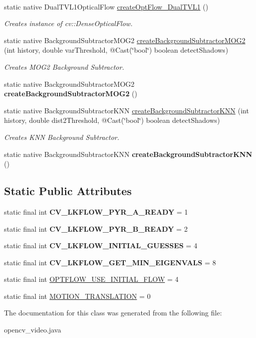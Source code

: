 \begin{DoxyCompactItemize}
$$\item 
static native Dual\+T\+V\+L1\+Optical\+Flow \hyperlink{group__video__track_ga02df311817502c4c088084195093be2e}{create\+Opt\+Flow\+\_\+\+Dual\+T\+V\+L1} ()
\begin{DoxyCompactList}\small\item\em Creates instance of cv\+::\+Dense\+Optical\+Flow. \end{DoxyCompactList}\item 
static native Background\+Subtractor\+M\+O\+G2 \hyperlink{group__video__motion_ga0820edc51bf6a34fb6ec60e0bfa47770}{create\+Background\+Subtractor\+M\+O\+G2} (int history, double var\+Threshold, @Cast(\char`\"{}bool\char`\"{}) boolean detect\+Shadows)
\begin{DoxyCompactList}\small\item\em Creates M\+O\+G2 Background Subtractor. \end{DoxyCompactList}\item 
static native Background\+Subtractor\+M\+O\+G2 {\bfseries create\+Background\+Subtractor\+M\+O\+G2} ()
\item 
static native Background\+Subtractor\+K\+NN \hyperlink{group__video__motion_ga1376788db4935dd8798d7e087e7697c9}{create\+Background\+Subtractor\+K\+NN} (int history, double dist2\+Threshold, @Cast(\char`\"{}bool\char`\"{}) boolean detect\+Shadows)
\begin{DoxyCompactList}\small\item\em Creates K\+NN Background Subtractor. \end{DoxyCompactList}\item 
static native Background\+Subtractor\+K\+NN {\bfseries create\+Background\+Subtractor\+K\+NN} ()
\end{DoxyCompactItemize}
\subsection*{Static Public Attributes}
\begin{DoxyCompactItemize}
\item 
static final int {\bfseries C\+V\+\_\+\+L\+K\+F\+L\+O\+W\+\_\+\+P\+Y\+R\+\_\+\+A\+\_\+\+R\+E\+A\+DY} = 1
\item 
static final int {\bfseries C\+V\+\_\+\+L\+K\+F\+L\+O\+W\+\_\+\+P\+Y\+R\+\_\+\+B\+\_\+\+R\+E\+A\+DY} = 2
\item 
static final int {\bfseries C\+V\+\_\+\+L\+K\+F\+L\+O\+W\+\_\+\+I\+N\+I\+T\+I\+A\+L\+\_\+\+G\+U\+E\+S\+S\+ES} = 4
\item 
static final int {\bfseries C\+V\+\_\+\+L\+K\+F\+L\+O\+W\+\_\+\+G\+E\+T\+\_\+\+M\+I\+N\+\_\+\+E\+I\+G\+E\+N\+V\+A\+LS} = 8
\item 
static final int \hyperlink{group__video__track_ga7544170e893b4e8835522881418d396d}{O\+P\+T\+F\+L\+O\+W\+\_\+\+U\+S\+E\+\_\+\+I\+N\+I\+T\+I\+A\+L\+\_\+\+F\+L\+OW} = 4
\item 
static final int \hyperlink{group__video__track_gaf37f7c8ec20fc62ff4ba2f00de67f1b3}{M\+O\+T\+I\+O\+N\+\_\+\+T\+R\+A\+N\+S\+L\+A\+T\+I\+ON} = 0
\end{DoxyCompactItemize}


The documentation for this class was generated from the following file\+:\begin{DoxyCompactItemize}
\item 
opencv\+\_\+video.\+java\end{DoxyCompactItemize}
